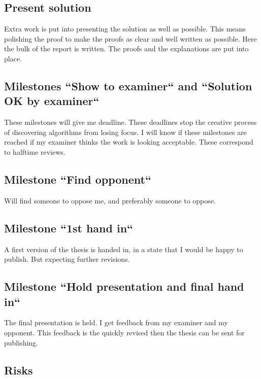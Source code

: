 \documentclass[msc,lith,english]{liuthesis}
\begin{document}
\subsection{Present solution}
Extra work is put into presenting the solution as well as possible.
This means polishing the proof to make the proofs as clear and well written as possible.
Here the bulk of the report is written. The proofs and the explanations are put into place.

\subsection{Milestones ``Show to examiner`` and ``Solution OK by examiner``}
These milestones will give me deadline.
These deadlines stop the creative process of discovering algorithms from losing focus.
I will know if these milestones are reached if my examiner thinks the work is looking acceptable.
These correspond to halftime reviews.

\subsection{Milestone ``Find opponent``}
Will find someone to oppose me, and preferably someone to oppose. 

\subsection{Milestone ``1st hand in``}
A first version of the thesis is handed in, in a state that I would be happy to
publish. But expecting further revisions.

\subsection{Milestone ``Hold presentation and final hand in``}
The final presentation is held. I get feedback from my examiner and my
opponent. This feedback is the quickly revised then the thesis can be sent for
publishing.

\subsection{Risks}
\end{document}
